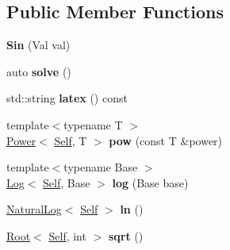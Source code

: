 \subsection*{Public Member Functions}
\begin{DoxyCompactItemize}
\item 
\hypertarget{classlatex_1_1math_1_1Sin_afc9adb31190ea8dba423e1f6c0c929fc}{{\bfseries Sin} (Val val)}\label{classlatex_1_1math_1_1Sin_afc9adb31190ea8dba423e1f6c0c929fc}

\item 
\hypertarget{classlatex_1_1math_1_1Sin_afb84d1944057a7571183e0c12f49f728}{auto {\bfseries solve} ()}\label{classlatex_1_1math_1_1Sin_afb84d1944057a7571183e0c12f49f728}

\item 
\hypertarget{classlatex_1_1math_1_1Sin_a1902ac69ef79cac82c34a1606016cf2f}{std\-::string {\bfseries latex} () const }\label{classlatex_1_1math_1_1Sin_a1902ac69ef79cac82c34a1606016cf2f}

\item 
\hypertarget{classlatex_1_1math_1_1Sin_a52b017c731ed2c1ba628b8853ab111e0}{{\footnotesize template$<$typename T $>$ }\\\hyperlink{classlatex_1_1math_1_1Power}{Power}$<$ \hyperlink{classlatex_1_1math_1_1Sin}{Self}, T $>$ {\bfseries pow} (const T \&power)}\label{classlatex_1_1math_1_1Sin_a52b017c731ed2c1ba628b8853ab111e0}

\item 
\hypertarget{classlatex_1_1math_1_1Sin_a896900fd34860eac35e577e1e220ccf8}{{\footnotesize template$<$typename Base $>$ }\\\hyperlink{classlatex_1_1math_1_1Log}{Log}$<$ \hyperlink{classlatex_1_1math_1_1Sin}{Self}, Base $>$ {\bfseries log} (Base base)}\label{classlatex_1_1math_1_1Sin_a896900fd34860eac35e577e1e220ccf8}

\item 
\hypertarget{classlatex_1_1math_1_1Sin_ac9fae5718ff01f38acbd9a6037f5b42a}{\hyperlink{classlatex_1_1math_1_1NaturalLog}{Natural\-Log}$<$ \hyperlink{classlatex_1_1math_1_1Sin}{Self} $>$ {\bfseries ln} ()}\label{classlatex_1_1math_1_1Sin_ac9fae5718ff01f38acbd9a6037f5b42a}

\item 
\hypertarget{classlatex_1_1math_1_1Sin_a36dc40787dcb9c438782902c1a4c8f41}{\hyperlink{classlatex_1_1math_1_1Root}{Root}$<$ \hyperlink{classlatex_1_1math_1_1Sin}{Self}, int $>$ {\bfseries sqrt} ()}\label{classlatex_1_1math_1_1Sin_a36dc40787dcb9c438782902c1a4c8f41}

\end{DoxyCompactItemize}
